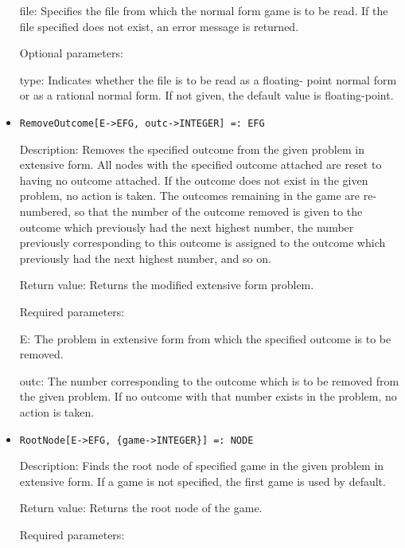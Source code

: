 \begin{itemize}
\bd
\item
[file:] Specifies the file from which the normal form game is to be
read.  If the file specified does not exist, an error message is
returned.
\ed

\item
[Optional parameters:]\hfil\null
	

\bd
\item
[type:] Indicates whether the file is to be read as a floating- point
normal form or as a rational normal form.  If not given, the default
value is floating-point.
\ed
\ed

\item

\protect \large \begin{verbatim}
RemoveOutcome[E->EFG, outc->INTEGER] =: EFG
\end{verbatim}\normalsize

\bd
\item
[Description:] Removes the specified outcome from the given problem in
extensive form.  All nodes with the specified outcome attached are
reset to having no outcome attached.  If the outcome does not exist in
the given problem, no action is taken.  The outcomes remaining in the
game are re-numbered, so that the number of the outcome removed is
given to the outcome which previously had the next highest number, the
number previously corresponding to this outcome is assigned to the
outcome which previously had the next highest number, and so on.
\item  
[Return value:] Returns the modified extensive form problem.
\item
[Required parameters:]\hfil\null
	
\bd
\item
[E:] The problem in extensive form from which the specified outcome is
to be removed.
\item
[outc:] The number corresponding to the outcome which is to be removed
from the given problem.  If no outcome with that number exists in the
problem, no action is taken.
\ed
\ed

\item
\protect \large \begin{verbatim}
RootNode[E->EFG, {game->INTEGER}] =: NODE
\end{verbatim}\normalsize

\bd
\item
[Description:] Finds the root node of specified game in the given
problem in extensive form.  If a game is not specified, the first game
is used by default.
\item
[Return value:] Returns the root node of the game.
\item
[Required parameters:]\hfil\null
	

\end{itemize}
